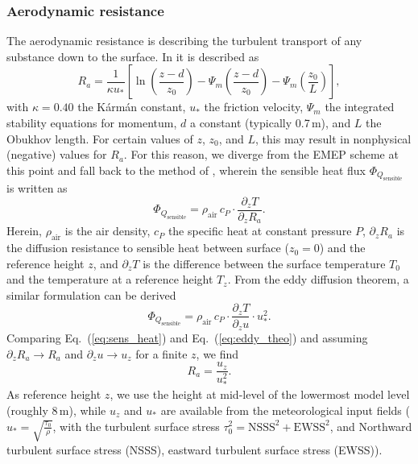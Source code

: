 \documentclass[gmd, manuscript]{copernicus}
\begin{document}
\subsubsection{Aerodynamic resistance}
\label{subsubsec:Ra}
The aerodynamic resistance is describing the turbulent transport of any substance down to the surface. In \citet{WASP:Simpson2003,ACP:Simpson2012} it is described as
\begin{equation}
  R_a = \frac{1}{\kappa u_*}\left[{\ln{\left(\frac{z-d}{z_0}\right)}-\Psi_m\left(\frac{z-d}{z_0}\right)-\Psi_m\left(\frac{z_0}{L}\right)}\right],
\end{equation}
with $\kappa = 0.40$ the K\'{a}rm\'{a}n constant, $u_*$ the friction velocity, $\Psi_m$ the integrated stability equations for momentum, $d$ a constant (typically 0.7\,\unit{m}), and $L$ the Obukhov length. For certain values of $z$, $z_0$, and $L$, this may result in nonphysical (negative) values for $R_a$. For this reason, we diverge from the EMEP scheme at this point and fall back to the method of \citet{Monteith1973}, wherein the sensible heat flux $\Phi_{Q_\text{sensible}}$ is written as
\begin{equation}
  \Phi_{Q_\text{sensible}} = \rho_\text{air}\,c_P \cdot \frac{\partial_z T}{\partial_z R_a}.
  \label{eq:sens_heat}
\end{equation}
Herein, $\rho_\text{air}$ is the air density, $c_P$ the specific heat at constant pressure $P$, $\partial_z R_a$ is the diffusion resistance to sensible heat between surface ($z_0 = 0$) and the reference height $z$, and $\partial_z T$ is the difference between the surface temperature $T_0$ and the temperature at a reference height $T_z$. From the eddy diffusion theorem, a similar formulation can be derived
\begin{equation}
  \Phi_{Q_\text{sensible}} = \rho_\text{air}\,c_P \cdot \frac{\partial_z T}{\partial_z u} \cdot u_*^2.
  \label{eq:eddy_theo}
\end{equation}
Comparing Eq.~(\ref{eq:sens_heat}) and Eq.~(\ref{eq:eddy_theo}) and assuming $\partial_z R_a \rightarrow R_a $ and $\partial_z u \rightarrow u_z $ for a finite $z$, we find 
\begin{equation}
  R_a = \frac{u_z}{u_*^2}.
\end{equation}
As reference height $z$, we use the height at mid-level of the lowermost model level (roughly 8\,\unit{m}), while $u_z$ and $u_*$ are available from the meteorological input fields ($u_* = \sqrt{\frac{\tau_0}{\rho}}$, with the turbulent surface stress $\tau_0^2 = \text{NSSS}^2 + \text{EWSS}^2$, and Northward turbulent surface stress (NSSS), eastward turbulent surface stress (EWSS)).
\end{document}
